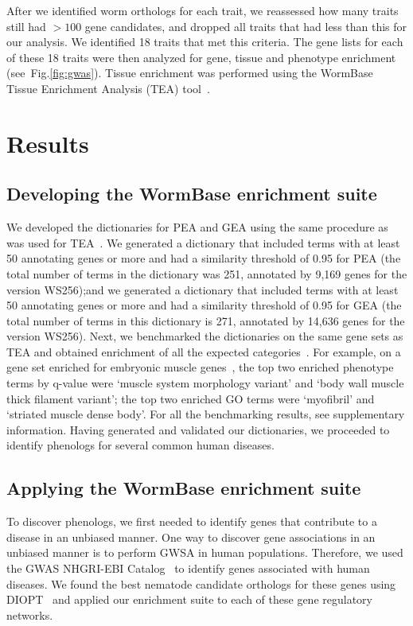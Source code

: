 \documentclass[10pt,letterpaper,twocolumn]{article}
\begin{document}
After we identified worm orthologs for each trait, we reassessed how many traits
still had $>100$ gene candidates, and dropped all traits that had less than this
for our analysis. We identified 18 traits that met this criteria. The gene
lists for each of these 18 traits were then analyzed for gene, tissue and
phenotype enrichment (see~Fig.\ref{fig:gwas}). Tissue enrichment was
performed using the WormBase Tissue Enrichment Analysis (TEA)
tool~\cite{Angeles-Albores2016}.


\section*{Results}
\subsection*{Developing the WormBase enrichment suite}
We developed the dictionaries for PEA and GEA using the same procedure as was
used for TEA~\cite{Angeles-Albores2016}. We generated a dictionary that
included terms with at
least 50 annotating genes or more and had a similarity threshold of 0.95 for PEA
(the total number of terms in the dictionary was 251, annotated by 9,169 genes
 for the version WS256);\@ and we generated a
dictionary that included terms with at least 50 annotating genes or more and
had a similarity threshold of 0.95 for GEA (the total number of terms in this
dictionary is 271, annotated by 14,636 genes for the version WS256).
\@ Next, we benchmarked the dictionaries on the same gene
sets as TEA and obtained enrichment of all the expected
categories~\cite{Gaudet2004a, Spencer2011, Cinar2005, Watson2008a,
Pauli2006, Portman2004, Fox2007, Smith2010}.
For example,
on a gene set enriched for embryonic muscle genes~\cite{Watson2008a},
the top two enriched
phenotype terms by q-value were `muscle system morphology variant' and `body
wall muscle thick filament variant'; the top two enriched GO terms were
`myofibril' and `striated muscle dense body'. For all the benchmarking
results, see supplementary information. Having generated and validated our
dictionaries, we proceeded to identify phenologs for several common human
diseases.

\subsection*{Applying the WormBase enrichment suite}
To discover phenologs, we first needed to identify genes that
contribute to a disease in an unbiased manner. One way to discover gene
associations in an unbiased manner is to perform GWSA in human populations.
Therefore, we used the GWAS NHGRI-EBI
Catalog~\cite{MacArthur2016} to identify genes associated with human diseases. We found the
best nematode candidate orthologs for these genes using DIOPT~\cite{Hu2011} and applied
our enrichment suite to each of these gene regulatory networks.
\end{document}
